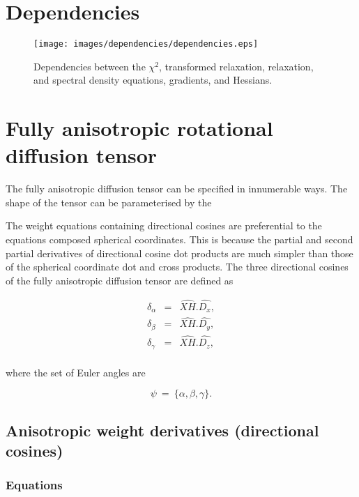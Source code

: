 
\newpage
\section{Dependencies}


\begin{figure}[!h]
\centerline{\texttt{[image: images/dependencies/dependencies.eps]}}
\caption{Dependencies between the $\chi^2$, transformed relaxation, relaxation, and spectral density equations, gradients, and Hessians.}\label{fig: dependencies}
\end{figure}




\newpage
\section{Fully anisotropic rotational diffusion tensor}

The fully anisotropic diffusion tensor can be specified in innumerable ways.  The shape of the tensor can be parameterised by the 


The weight equations containing directional cosines are preferential to the equations composed spherical coordinates.  This is because the partial and second partial derivatives of directional cosine dot products are much simpler than those of the spherical coordinate dot and cross products.  The three directional cosines of the fully anisotropic diffusion tensor are defined as

\begin{eqnarray}
    \delta_\alpha & = & \widehat{XH} . \widehat{D_x},   \label{eq: dir cos: da} \\
    \delta_\beta  & = & \widehat{XH} . \widehat{D_y},   \label{eq: dir cos: db} \\
    \delta_\gamma & = & \widehat{XH} . \widehat{D_z},   \label{eq: dir cos: dg} \\
\end{eqnarray}

\noindent where the set of Euler angles are

\begin{equation}
    \psi \ = \ \{\alpha, \beta, \gamma\}.   \label{eq: dir cos: euler}
\end{equation}



\subsection{Anisotropic weight derivatives (directional cosines)}

\subsubsection{Equations}




